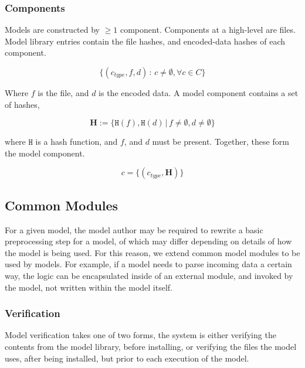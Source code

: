 \documentclass[10pt, titlepage, twocolumn]{article}
\begin{document}
\subsubsection{Components}
Models are constructed by \(\geq 1\) component. Components at a high-level are files. Model library entries contain the file hashes, and encoded-data hashes of each component.

\begin{equation}
\{ (c_{type},  f, d) \, : \, c \ne \emptyset, \forall c \in C \}
\end{equation}

Where \(f\) is the file, and \(d\) is the encoded data. A model component contains a set of hashes, 

\begin{equation}
\boldsymbol{H} := \{ \texttt{H}(f), \texttt{H}(d) \, \vert \, f \ne \emptyset , d \ne \emptyset \}
\end{equation}

where \(\texttt{H}\) is a hash function, and \(f\), and \(d\) must be present. Together, these form the model component.



\begin{equation}
c = \{ (c_{type},  \boldsymbol{H} ) \}
\end{equation}


\subsection{Common Modules}
For a given model, the model author may be required to rewrite a basic preprocessing step for a model, of which may differ depending on details of how the model is being used. For this reason, we extend common model modules to be used by models. For example, if a model needs to parse incoming data a certain way, the logic can be encapsulated inside of an external module, and invoked by the model, not written within the model itself.




\subsubsection{Verification}
Model verification takes one of two forms, the system is either verifying the contents from the model library, before installing, or verifying the files the model uses, after being installed, but prior to each execution of the model.
\end{document}
